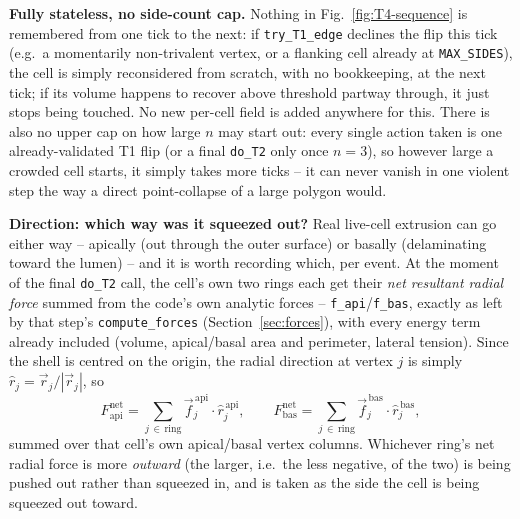 \documentclass[11pt,a4paper]{report}
\begin{document}
\textbf{Fully stateless, no side-count cap.} Nothing in
Fig.~\ref{fig:T4-sequence} is remembered from one tick to the next: if
\texttt{try\_T1\_edge} declines the flip this tick (e.g.\ a momentarily
non-trivalent vertex, or a flanking cell already at
\texttt{MAX\_SIDES}), the cell is simply reconsidered from scratch,
with no bookkeeping, at the next tick; if its volume happens to recover
above threshold partway through, it just stops being touched. No new
per-cell field is added anywhere for this. There is also no upper cap
on how large $n$ may start out: every single action taken is one
already-validated T1 flip (or a final \texttt{do\_T2} only once
$n=3$), so however large a crowded cell starts, it simply takes more
ticks -- it can never vanish in one violent step the way a direct
point-collapse of a large polygon would.

\textbf{Direction: which way was it squeezed out?} Real live-cell
extrusion can go either way -- apically (out through the outer
surface) or basally (delaminating toward the lumen) -- and it is worth
recording which, per event. At the moment of the final \texttt{do\_T2}
call, the cell's own two rings each get their \emph{net resultant
radial force} summed from the code's own analytic forces --
\texttt{f\_api}/\texttt{f\_bas}, exactly as left by that step's
\texttt{compute\_forces} (Section~\ref{sec:forces}), with every energy
term already included (volume, apical/basal area and perimeter,
lateral tension). Since the shell is centred on the origin, the radial
direction at vertex $j$ is simply $\hat r_j = \vec r_j / |\vec r_j|$,
so
\begin{equation}
  F^{\mathrm{net}}_{\mathrm{api}} = \sum_{j \,\in\, \text{ring}} \vec f^{\,\mathrm{api}}_j \cdot \hat r^{\,\mathrm{api}}_j,
  \qquad
  F^{\mathrm{net}}_{\mathrm{bas}} = \sum_{j \,\in\, \text{ring}} \vec f^{\,\mathrm{bas}}_j \cdot \hat r^{\,\mathrm{bas}}_j,
  \label{eq:T4-direction-forces}
\end{equation}
summed over that cell's own apical/basal vertex columns. Whichever
ring's net radial force is more \emph{outward} (the larger, i.e.\ the
less negative, of the two) is being pushed out rather than squeezed
in, and is taken as the side the cell is being squeezed out toward.
\end{document}

